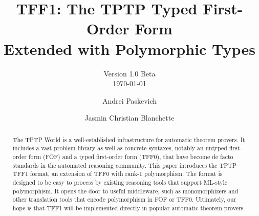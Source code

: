 \documentclass[draft,a4paper]{llncs}
\begin{document}
\title{
TFF1: The TPTP Typed First-Order Form \\ Extended with %
Polymorphic Types}
\subtitle{Version 1.0 Beta \\ \small \today}

\author{
Andrei Paskevich \and Jasmin Christian Blanchette
}


\maketitle

\begin{abstract}
The TPTP World is a well-established infrastructure for automatic theorem
provers. It includes a vast problem library as well as concrete syntaxes,
notably an untyped first-order form (FOF) and a typed first-order form (TFF0),
that have become de facto standards in the automated reasoning community. This
paper introduces the TPTP TFF1 format, an extension of TFF0 with rank-1
polymorphism. The format is designed to be easy to process by existing
reasoning tools that support ML-style polymorphism. It opens the door to useful
middleware, such as monomorphizers and other translation tools that encode
polymorphism in FOF or TFF0. Ultimately, our hope is that TFF1 will be
implemented directly in popular automatic theorem provers.
\end{abstract}












\end{document}
